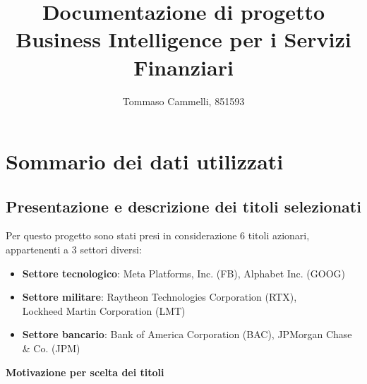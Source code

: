 \documentclass{article}
\title{Documentazione di progetto\\ Business Intelligence per i Servizi Finanziari}
\author{Tommaso Cammelli, 851593}
\begin{document}
\maketitle

\section{Sommario dei dati utilizzati}

\subsection{Presentazione e descrizione dei titoli selezionati}

Per questo progetto sono stati presi in considerazione 6 titoli azionari, appartenenti a 3 settori diversi:

\begin{itemize}
    \item \textbf{Settore tecnologico}: Meta Platforms, Inc. (FB), Alphabet Inc. (GOOG)
    \item \textbf{Settore militare}: Raytheon Technologies Corporation (RTX),\\ Lockheed Martin Corporation (LMT)
    \item \textbf{Settore bancario}: Bank of America Corporation (BAC), JPMorgan Chase \& Co. (JPM)
\end{itemize}

\textbf{Motivazione per scelta dei titoli}
\end{document}
